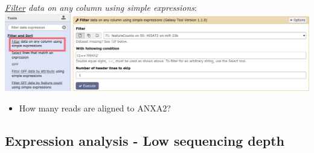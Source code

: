 \documentclass[11pt,a4paper]{article}
\begin{document}
\textit{\underline{Filter} data on any column using simple expressions}:\\
\includegraphics[width=\textwidth]{figures/expression_02.png}\\
\begin{itemize}
	\item How many reads are aligned to ANXA2?
\end{itemize}

\subsection{Expression analysis - Low sequencing depth}

%
%


\vspace{-1.5em}

\end{document}
